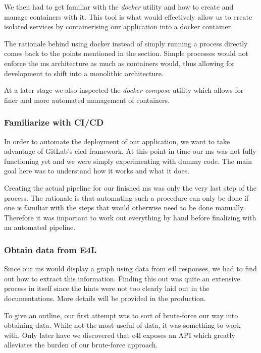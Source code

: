 We then had to get familiar with the \textit{docker} utility and how
to create and manage containers with it. This tool is what would
effectively allow us to create isolated services by containerising our
application into a docker container.

The rationale behind using docker instead of simply running a process
directly comes back to the points mentioned in the
 section. Simple processes would not
enforce the \gls{ms} architecture as much as containers would, thus
allowing for development to shift into a monolithic architecture.

At a later stage we also inspected the \textit{docker-compose}
utility which allows for finer and more automated management of
containers.

\subsubsection{Familiarize with CI/CD}

In order to automate the deployment of our application, we want to
take advantage of GitLab's \gls{cicd} framework. At this point in time
our \gls{ms} was not fully functioning yet and we were simply
experimenting with dummy code. The main goal here was to understand
how it works and what it does.

Creating the actual pipeline for our finished \gls{ms} was only the
very last step of the process. The rationale is that automating such a
procedure can only be done if one is familiar with the steps that
would otherwise need to be done manually. Therefore it was important
to work out everything by hand before finalizing with an automated
pipeline.

\subsubsection{Obtain data from E4L}

Since our \gls{ms} would display a graph using data from \gls{e4l}
responses, we had to find out how to extract this information. Finding
this out was quite an extensive process in itself since the hints were
not too clearly laid out in the documentations. More details will be
provided in the production.

To give an outline, our first attempt was to sort of brute-force our
way into obtaining data. While not the most useful of data, it was
something to work with. Only later have we discovered that \gls{e4l}
exposes an API which greatly alleviates the burden of our brute-force
approach.


